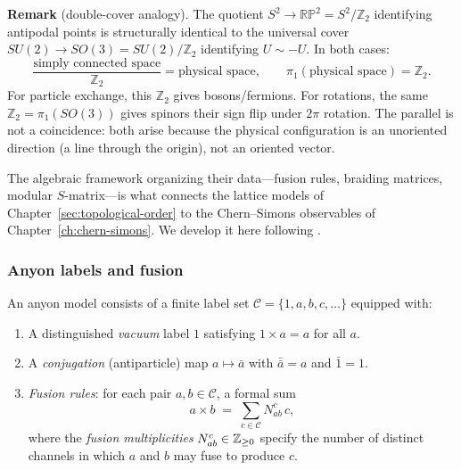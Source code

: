 \medskip
\noindent\textbf{Remark} (double-cover analogy).
The quotient $S^2 \to \mathbb{RP}^2 = S^2/\mathbb{Z}_2$ identifying antipodal points is structurally identical to the universal cover $SU(2) \to SO(3) = SU(2)/\mathbb{Z}_2$ identifying $U \sim -U$.  In both cases:
\begin{equation}
  \frac{\text{simply connected space}}{\mathbb{Z}_2} = \text{physical space},
  \qquad
  \pi_1(\text{physical space}) = \mathbb{Z}_2.
\end{equation}
For particle exchange, this $\mathbb{Z}_2$ gives bosons/fermions.  For rotations, the same $\mathbb{Z}_2 = \pi_1(SO(3))$ gives spinors their sign flip under $2\pi$ rotation.  The parallel is not a coincidence: both arise because the physical configuration is an unoriented direction (a line through the origin), not an oriented vector.

\bigskip

The algebraic framework organizing their data---fusion rules, braiding matrices, modular $S$-matrix---is what connects the lattice models of Chapter~\ref{sec:topological-order} to the Chern--Simons observables of Chapter~\ref{ch:chern-simons}.  We develop it here following \cite{NayakSimonSternFreedmanDasSarma2008NonabelianAnyons,Kitaev2003FaultTolerant}.

\subsubsection*{Anyon labels and fusion}

\begin{definition}
\label{def:anyon-model-fusion}
An anyon model consists of a finite label set
$\mathcal{C} = \{1, a, b, c, \ldots\}$ equipped with:
\begin{enumerate}
    \item A distinguished \emph{vacuum} label $1$ satisfying $1 \times a = a$ for all $a$.
    \item A \emph{conjugation} (antiparticle) map $a \mapsto \bar{a}$ with
          $\bar{\bar{a}} = a$ and $\bar{1} = 1$.
    \item \emph{Fusion rules}: for each pair $a, b \in \mathcal{C}$, a formal sum
\begin{equation}
\label{eq:fusion-rule}
    a \times b \;=\; \sum_{c \in \mathcal{C}} N^{c}_{ab}\, c,
\end{equation}
where the \emph{fusion multiplicities} $N^c_{ab} \in \mathbb{Z}_{\ge 0}$ specify
the number of distinct channels in which $a$ and $b$ may fuse to produce $c$.
\end{enumerate}
\end{definition}

